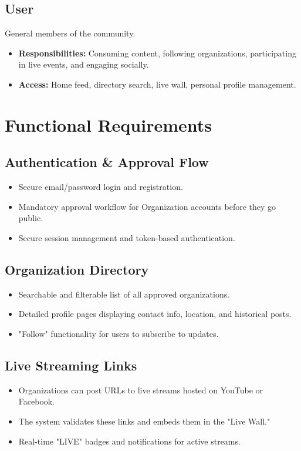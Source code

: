\documentclass[12pt, a4paper]{report}
\begin{document}
\section{User}
General members of the community.
\begin{itemize}
    \item \textbf{Responsibilities:} Consuming content, following organizations, participating in live events, and engaging socially.
    \item \textbf{Access:} Home feed, directory search, live wall, personal profile management.
\end{itemize}

\chapter{Functional Requirements}

\section{Authentication \& Approval Flow}
\begin{itemize}
    \item Secure email/password login and registration.
    \item Mandatory approval workflow for Organization accounts before they go public.
    \item Secure session management and token-based authentication.
\end{itemize}

\section{Organization Directory}
\begin{itemize}
    \item Searchable and filterable list of all approved organizations.
    \item Detailed profile pages displaying contact info, location, and historical posts.
    \item "Follow" functionality for users to subscribe to updates.
\end{itemize}

\section{Live Streaming Links}
\begin{itemize}
    \item Organizations can post URLs to live streams hosted on YouTube or Facebook.
    \item The system validates these links and embeds them in the "Live Wall."
    \item Real-time "LIVE" badges and notifications for active streams.
\end{itemize}
\end{document}
